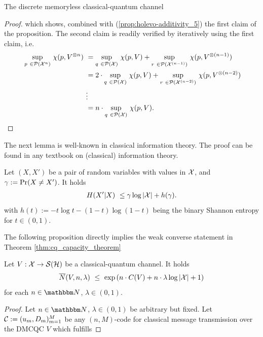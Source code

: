 \begin{section}{The discrete memoryless  classical-quantum channel}
\begin{proof}
      which shows, combined with (\ref{prop:holevo-additivity_5}) the first claim of the proposition. \newline 
      The second claim is readily verified by iteratively using the first claim, i.e. 
      \begin{align*}
         \ \underset{p \ \in \cP(\cX^n)}{\sup} \ \chi(p, V^{\otimes n}) \ 
         & = \underset{q \ \in \cP(\cX)}{\sup} \ \chi(p, V) + \underset{r \ \in \cP(\cX^{(n-1)})}{\sup} \ \chi(p, V^{\otimes (n-1)}) \\
         & = 2 \cdot \underset{q \ \in \cP(\cX)}{\sup} \ \chi(p, V) + \underset{r \ \in \cP(\cX^{(n-2)})}{\sup} \ \chi(p, V^{\otimes (n-2)}) \\
         & \vdots \\
         & = n \cdot \underset{q \ \in \cP(\cX)}{\sup} \ \chi(p, V). 
      \end{align*}
      \end{proof}
      The next lemma is well-known in classical information theory. The proof can be found in any textbook on (classical) information theory.
      \begin{lemma}[Fano's Lemma] \label{lemma:fano} \index{Fano's lemma}
       Let $(X,X')$ be a pair of random variables with values in ${\mathcal X}$, and $\gamma := \mathrm{Pr}(X \neq X')$. It holds
       \begin{align}
        H(X'|X) \ \leq \gamma \log |{\mathcal X}| + h(\gamma).
       \end{align}
       with $h(t) := -t\log t - (1-t) \log (1-t)$ being the binary Shannon entropy for $t \in (0,1)$. 
      \end{lemma}
      The following proposition directly implies the weak converse statement in Theorem \ref{thm:cq_capacity_theorem} 
      \begin{proposition}\label{prop:weak_converse_inequality}
       Let $V: {\mathcal X} \rightarrow {\mathcal S}({\mathcal H})$ be a classical-quantum channel. It holds
       \begin{align}
        \overline{N}(V,n,\lambda) \ \leq \ \exp \left(n \cdot C(V) + n\cdot \lambda \log |{\mathcal X}| + 1 \right) \label{prop:weak_converse_inequality_1}
       \end{align}
       for each $n \in \bbmN$, $\lambda \in (0,1)$. 
       \end{proposition}
       \begin{proof}
       Let $n \in \bbmN$, $\lambda \in (0,1)$ be arbitrary but fixed. Let ${\mathcal C} := (u_m,D_m)_{m=1}^M$ be any $(n,M)$-code for classical message transmission over the DMCQC $V$ which fulfills

\end{proof}
\end{section}
